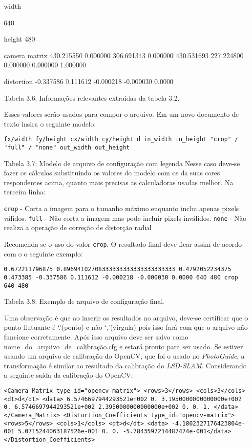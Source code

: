 width

640

height
480

camera matrix
430.215550 0.000000 306.691343
0.000000 430.531693 227.224800
0.000000 0.000000 1.000000

distortion
-0.337586 0.111612 -0.000218 -0.000030 0.0000


Tabela 3.6: Informações relevantes extraídas da tabela 3.2.

Esses valores serão usados para compor o arquivo. Em um novo documento de texto insira o seguinte modelo:

\texttt{fx/width fy/height cx/width cy/height d
in\_width in\_height
"crop" / "full" / "none"
out\_width out\_height}

Tabela 3.7: Modelo de arquivo de configuração com legenda
Nesse caso deve-se fazer os cálculos substituindo os valores do modelo com os da suas cores respondentes acima, quanto mais precisas as calculadoras usadas melhor. Na terceira linha:

\texttt{crop} - Corta a imagem para o tamanho máximo enquanto inclui apenas pixels válidos.
\texttt{full} - Não corta a imagem mas pode incluir pixels inválidos.
\texttt{none} - Não realiza a operação de correção de distorção radial

Recomenda-se o uso do valor \texttt{crop}. O resultado final deve ficar assim de acordo com o o seguinte exemplo:

\texttt{0.672211796875 0.89694102708333333333333333333333 0.4792052234375 0.473385 -0.337586 0.111612 -0.000218 -0.000030 0.0000 
640 480
crop
640 480}

Tabela 3.8: Exemplo de arquivo de configuração final.

Uma observação é que ao inserir os resultados no arquivo, deve-se certificar que o ponto flutuante é ‘.’(ponto) e não ‘,’(vírgula) pois isso fará com que o arquivo não funcione corretamente. Após isso arquivo deve ser salvo como {nome\_do\_arquivo\_de\_calibração.cfg} e estará pronto para ser usado. Se estiver usando um arquivo de calibração do OpenCV, que foi o usado no \textit{PhotoGuide}, a transformação é similar ao resultado da calibração do \textit{LSD-SLAM}. Considerando a seguinte saída da calibração do OpenCV:

\texttt{<Camera\_Matrix type\_id="opencv-matrix">
<rows>3</rows>
<cols>3</cols>
<dt>d</dt>
<data>
 6.5746697944293521e+002 0. 3.1950000000000000e+002
 0. 6.5746697944293521e+002 2.3950000000000000e+002
 0. 0. 1.
</data></Camera\_Matrix>
<Distortion\_Coefficients type\_id="opencv-matrix">
<rows>5</rows>
<cols>1</cols>
<dt>d</dt>
<data>
 -4.1802327176423804e-001 5.0715244063187526e-001 0. 0. -5.7843597214487474e-001</data></Distortion\_Coefficients>}
 
